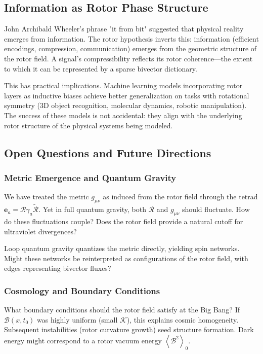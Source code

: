 \documentclass[11pt,a4paper]{article}
\newcommand{\grade}[2]{\left\langle #1 \right\rangle_{#2}}
\newcommand{\scal}[1]{\grade{#1}{0}}
\newcommand{\rev}[1]{\widetilde{#1}}           %
\newcommand{\Rotor}{\mathcal{R}}
\newcommand{\Biv}{\mathcal{B}}
\theoremstyle{definition}
\theoremstyle{plain}
\theoremstyle{remark}
\begin{document}
\subsection{Information as Rotor Phase Structure}

John Archibald Wheeler's phrase "it from bit" suggested that physical reality emerges from information. The rotor hypothesis inverts this: information (efficient encodings, compression, communication) emerges from the geometric structure of the rotor field. A signal's compressibility reflects its rotor coherence---the extent to which it can be represented by a sparse bivector dictionary.

This has practical implications. Machine learning models incorporating rotor layers as inductive biases achieve better generalization on tasks with rotational symmetry (3D object recognition, molecular dynamics, robotic manipulation). The success of these models is not accidental: they align with the underlying rotor structure of the physical systems being modeled.

\subsection{Open Questions and Future Directions}

\subsubsection{Metric Emergence and Quantum Gravity}

We have treated the metric $g_{\mu\nu}$ as induced from the rotor field through the tetrad $\mathbf{e}_a = \Rotor \gamma_a \rev{\Rotor}$. Yet in full quantum gravity, both $\Rotor$ and $g_{\mu\nu}$ should fluctuate. How do these fluctuations couple? Does the rotor field provide a natural cutoff for ultraviolet divergences?

Loop quantum gravity quantizes the metric directly, yielding spin networks. Might these networks be reinterpreted as configurations of the rotor field, with edges representing bivector fluxes?

\subsubsection{Cosmology and Boundary Conditions}

What boundary conditions should the rotor field satisfy at the Big Bang? If $\Biv(x,t_0)$ was highly uniform (small $\mathcal{K}$), this explains cosmic homogeneity. Subsequent instabilities (rotor curvature growth) seed structure formation. Dark energy might correspond to a rotor vacuum energy $\scal{\Biv^2}$.
\end{document}
